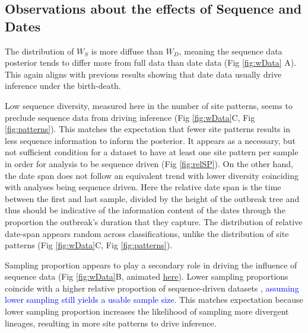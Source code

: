 \documentclass{article}
\begin{document}
\subsection*{Observations about the effects of Sequence and Dates}
The distribution of $W_S$ is more diffuse than $W_D$, meaning the sequence data posterior tends to differ more from full data than date data (Fig \ref{fig:wData} A). This again aligns with previous results showing that date data usually drive inference under the birth-death.

Low sequence diversity, measured here in the number of site patterns, seems to preclude sequence data from driving inference (Fig \ref{fig:wData}C, Fig \ref{fig:patterns}). This matches the expectation that fewer site patterns results in less sequence information to inform the posterior. It appears as a necessary, but not sufficient condition for a dataset to have at least one site pattern per sample in order for analysis to be sequence driven (Fig \ref{fig:relSP}). On the other hand, the date span  does not follow an equivalent trend with lower diversity coinciding with analyses being sequence driven. Here the relative date span is the time between the first and last sample, divided by the height of the outbreak tree and thus should be indicative of the information content of the dates through the proportion the outbreak's duration that they capture. The distribution of relative date-span appears random across classifications, unlike the distribution of site patterns (Fig \ref{fig:wData}C, Fig \ref{fig:patterns}).

Sampling proportion appears to play a secondary role in driving the influence of sequence data (Fig \ref{fig:wData}B, animated \href{https://github.com/LeoFeatherstone/phyloDataSignal/blob/main/figures/wassTraj.gif}{\underline{here}}). Lower sampling proportions coincide with a higher relative proportion of sequence-driven datasets \textcolor{blue}{, assuming lower sampling still yields a usable sample size}. This matches expectation because lower sampling proportion increases the likelihood of sampling more divergent lineages, resulting in more site patterns to drive inference.
\end{document}
